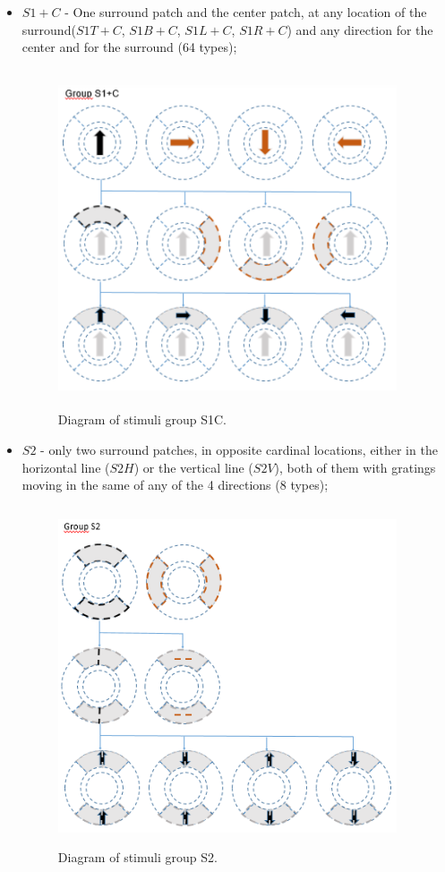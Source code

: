 \begin{itemize}
\item $S1+C$ - One surround patch and the center patch, at any location of the surround($S1T+C$, $S1B+C$, $S1L+C$, $S1R+C$) and any direction for the center and for the surround (64 types);

\begin{figure}[H] \centering \includegraphics[width=10cm,height=10cm,keepaspectratio]{Figures/4.Chapter/S1C.PNG} \caption{Diagram of stimuli group S1C.} \end{figure}

\item $S2$ - only two surround patches, in opposite cardinal locations, either in the horizontal line ($S2H$) or the vertical line ($S2V$), both of them with gratings moving in the same of any of the 4 directions (8 types);

\begin{figure}[H] \centering \includegraphics[width=10cm,height=10cm,keepaspectratio]{Figures/4.Chapter/S2.PNG} \caption{Diagram of stimuli group S2.} \end{figure}


\end{itemize}
